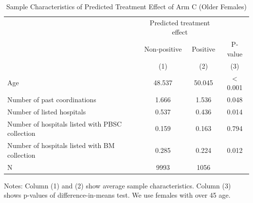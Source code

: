 \documentclass[
]{article}
\begin{document}
\begin{table}[H]

\caption{\label{tab:rcf-older-female}Sample Characteristics of Predicted Treatment Effect of Arm C (Older Females)}
\centering
\fontsize{9}{11}\selectfont
\fontsize{9}{11}\selectfont
\begin{threeparttable}
\begin{tabular}[t]{lccc}
\toprule
\multicolumn{1}{c}{ } & \multicolumn{2}{c}{Predicted treatment effect} & \multicolumn{1}{c}{ } \\
\cmidrule(l{3pt}r{3pt}){2-3}
\multicolumn{1}{c}{ } & \multicolumn{1}{c}{Non-positive} & \multicolumn{1}{c}{Positive} & \multicolumn{1}{c}{P-value} \\
\cmidrule(l{3pt}r{3pt}){2-2} \cmidrule(l{3pt}r{3pt}){3-3} \cmidrule(l{3pt}r{3pt}){4-4}
 & (1) & (2) & (3)\\
\midrule
Age & 48.537 & 50.045 & < 0.001\\
Number of past coordinations & 1.666 & 1.536 & 0.048\\
Number of listed hospitals & 0.537 & 0.436 & 0.014\\
Number of hospitals listed with PBSC collection & 0.159 & 0.163 & 0.794\\
Number of hospitals listed with BM collection & 0.285 & 0.224 & 0.012\\
N & 9993 & 1056 & \\
\bottomrule
\end{tabular}
\begin{tablenotes}
\item Notes: Column (1) and (2) show average sample characteristics. Column (3) shows p-values of difference-in-means test. We use females with over 45 age.
\end{tablenotes}
\end{threeparttable}
\end{table}

\clearpage

\renewcommand\refname{References}
  
\end{document}
